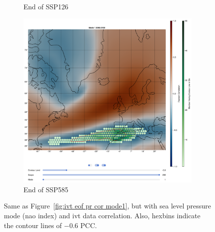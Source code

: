 \begin{figure}[!htb]
\begin{subfigure}[b]{0.32\textwidth}
    \caption{End of SSP126} 
    \label{fig:psl eof ivt cor ssp126 mode1}
  \end{subfigure}
  \begin{subfigure}[b]{0.32\textwidth}
    \includegraphics[width=\textwidth]{figures/psl_ivt_cor_mode1_ssp585.png}
    \caption{End of SSP585}
    \label{fig:psl eof ivt cor ssp585 mode1}
  \end{subfigure}
  \caption{Same as Figure~\ref{fig:ivt eof pr cor mode1}, but with sea level pressure mode (\ac{nao} index) and \ac{ivt} data correlation. Also, hexbins indicate the contour lines of $-0.6$ PCC.}
  \label{fig:psl eof ivt cor mode1}
\end{figure}


